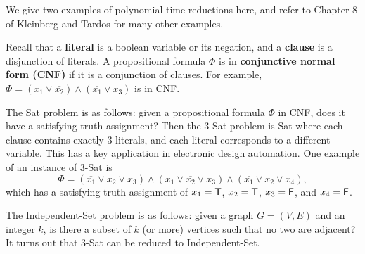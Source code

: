 We give two examples of polynomial time reductions here, and refer to Chapter 
8 of Kleinberg and Tardos for many other examples. 

Recall that a {\bf literal} is a boolean variable or its negation, and a 
{\bf clause} is a disjunction of literals. A propositional formula $\Phi$ is 
in {\bf conjunctive normal form (CNF)} if it is a conjunction of clauses. 
For example, $\Phi = (x_1 \vee \overline{x_2}) \wedge (\overline{x_1} 
\vee x_3)$ is in CNF. 

The {\sc Sat} problem is as follows: given a propositional formula $\Phi$ in 
CNF, does it have a satisfying truth assignment? Then the {\sc $3$-Sat} problem 
is {\sc Sat} where each clause contains exactly $3$ literals, and each literal 
corresponds to a different variable. This has a key application in electronic 
design automation. One example of an instance of {\sc $3$-Sat} is 
\[ \Phi = (\overline{x_1} \vee x_2 \vee x_3) \wedge (x_1 \vee \overline{x_2} 
\vee x_3) \wedge (\overline{x_1} \vee x_2 \vee x_4), \] 
which has a satisfying truth assignment of $x_1 = {\sf T}$, $x_2 = {\sf T}$, 
$x_3 = {\sf F}$, and $x_4 = {\sf F}$. 

The {\sc Independent-Set} problem is as follows: given a graph $G = (V, E)$ 
and an integer $k$, is there a subset of $k$ (or more) vertices such that 
no two are adjacent? It turns out that {\sc $3$-Sat} can be reduced to 
{\sc Independent-Set}. 

